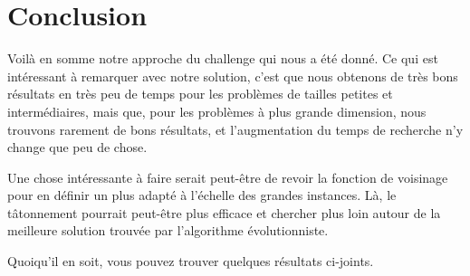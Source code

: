 \section{Conclusion}
Voilà en somme notre approche du challenge qui nous a été donné. Ce qui est intéressant à remarquer avec notre solution, c'est que nous obtenons de très bons résultats en très peu de temps pour les problèmes de tailles petites et intermédiaires, mais que, pour les problèmes à plus grande dimension, nous trouvons rarement de bons résultats, et l'augmentation du temps de recherche n'y change que peu de chose.\\

\vspace{1em}

Une chose intéressante à faire serait peut-être de revoir la fonction de voisinage pour en définir un plus adapté à l'échelle des grandes instances. Là, le tâtonnement pourrait peut-être plus efficace et chercher plus loin autour de la meilleure solution trouvée par l'algorithme évolutionniste.\\

\vspace{1em}

Quoiqu'il en soit, vous pouvez trouver quelques résultats ci-joints.